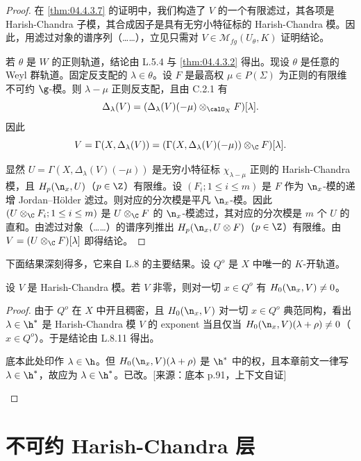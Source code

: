 \begin{proof}
在 \ref{thm:04.4.3.7} 的证明中，我们构造了 $V$ 的一个有限滤过，其各项是 Harish-Chandra 子模，其合成因子是具有无穷小特征标的 Harish-Chandra 模。因此，用滤过对象的谱序列（……），立见只需对 $V\in\mathcal{M}_{fg}(U_\theta,K)$ 证明结论。

若 $\theta$ 是 $W$ 的正则轨道，结论由 L.5.4 与 \ref{thm:04.4.3.2} 得出。现设 $\theta$ 是任意的 Weyl 群轨道。固定反支配的 $\lambda\in\theta$。设 $F$ 是最高权 $\mu\in P(\Sigma)$ 为正则的有限维不可约 $\g$-模。则 $\lambda-\mu$ 正则反支配，且由 C.2.1 有
$$\Delta_\lambda(V)=(\Delta_\lambda(V)(-\mu)\otimes_{\calO_X}F)[\lambda].$$
因此
$$V=\Gamma(X,\Delta_\lambda(V))=(\Gamma(X,\Delta_\lambda(V)(-\mu))\otimes_\C F)[\lambda].$$

显然 $U=\Gamma(X,\Delta_\lambda(V)(-\mu))$ 是无穷小特征标 $\chi_{\lambda-\mu}$ 正则的 Harish-Chandra 模，且 $H_p(\n_x,U)$（$p\in\Z$）有限维。设 $(F_i;1\le i\le m)$ 是 $F$ 作为 $\n_x$-模的递增 Jordan–Hölder 滤过。则对应的分次模是平凡 $\n_x$-模。因此 $(U\otimes_\C F_i;1\le i\le m)$ 是 $U\otimes_\C F$ 的 $\n_x$-模滤过，其对应的分次模是 $m$ 个 $U$ 的直和。由滤过对象（……）的谱序列推出 $H_p(\n_x,U\otimes F)$（$p\in\Z$）有限维。由 $V=(U\otimes_\C F)[\lambda]$ 即得结论。
\end{proof}

下面结果深刻得多，它来自 L.8 的主要结果。设 $Q^o$ 是 $X$ 中唯一的 $K$-开轨道。

\begin{theorem}\label{thm:04.4.4.2}
设 $V$ 是 Harish-Chandra 模。若 $V$ 非零，则对一切 $x\in Q^o$ 有 $H_0(\n_x,V)\neq 0$。
\end{theorem}

\begin{proof}
由于 $Q^o$ 在 $X$ 中开且稠密，且 $H_0(\n_x,V)$ 对一切 $x\in Q^o$ 典范同构，看出 $\lambda\in\h^*$ 是 Harish-Chandra 模 $V$ 的 exponent 当且仅当 $H_0(\n_x,V)(\lambda+\rho)\neq 0$（$x\in Q^o$）。于是结论由 L.8.11 得出。
\begin{annote}
底本此处印作 $\lambda\in\h$。但 $H_0(\n_x,V)(\lambda+\rho)$ 是 $\h^*$ 中的权，且本章前文一律写 $\lambda\in\h^*$，故应为 $\lambda\in\h^*$。已改。[来源：底本 p.91，上下文自证]
\end{annote}
\end{proof}

\section{不可约 Harish-Chandra 层}
\label{sec:04.4.5}

